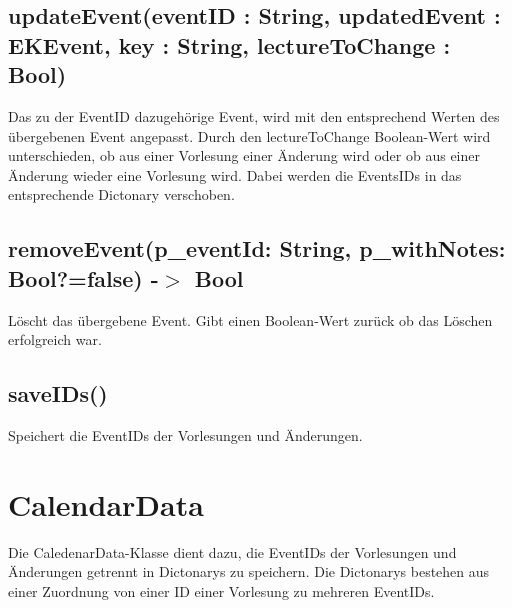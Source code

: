 \subsection{updateEvent(eventID : String, updatedEvent : EKEvent, key : String, lectureToChange : Bool)}
Das zu der EventID dazugehörige Event, wird mit den entsprechend Werten des übergebenen Event angepasst. Durch den lectureToChange Boolean-Wert wird unterschieden, ob aus einer Vorlesung einer Änderung wird oder ob aus einer Änderung wieder eine Vorlesung wird. Dabei werden die EventsIDs in das entsprechende Dictonary verschoben.

\subsection{removeEvent(p\_eventId: String, p\_withNotes: Bool?=false) -$>$ Bool}
Löscht das übergebene Event. Gibt einen Boolean-Wert zurück ob das Löschen erfolgreich war.

\subsection{saveIDs()}
Speichert die EventIDs der Vorlesungen und Änderungen.

\newpage
\section{CalendarData}
Die CaledenarData-Klasse dient dazu, die EventIDs der Vorlesungen und Änderungen getrennt in Dictonarys zu speichern.
Die Dictonarys bestehen aus einer Zuordnung von einer ID einer Vorlesung zu mehreren EventIDs.

